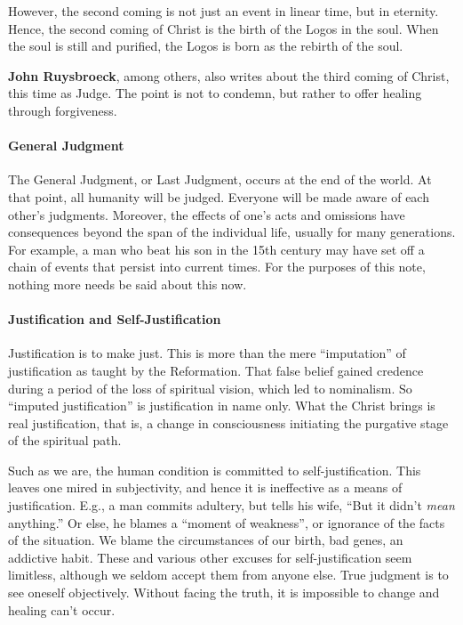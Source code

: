 However, the second coming is not just an event in linear time, but in eternity. Hence, the second coming of Christ is
the birth of the Logos in the soul. When the soul is still and purified, the Logos is born as the rebirth of the soul.

\textbf{John Ruysbroeck}, among others, also writes about the third coming of Christ, this time as Judge. The point is
not to condemn, but rather to offer healing through forgiveness.

\paragraph{General Judgment}
The General Judgment, or Last Judgment, occurs at the end of the world. At that point, all humanity will be judged.
Everyone will be made aware of each other's judgments. Moreover, the effects of one's acts and
omissions have consequences beyond the span of the individual life, usually for many generations. For example, a man
who beat his son in the 15th century may have set off a chain of events that persist into current times. For the
purposes of this note, nothing more needs be said about this now.

\paragraph{Justification and Self-Justification}
Justification is to make just. This is more than the mere “imputation” of justification as taught by the Reformation.
That false belief gained credence during a period of the loss of spiritual vision, which led to nominalism. So “imputed
justification” is justification in name only. What the Christ brings is real justification, that is, a change in
consciousness initiating the purgative stage of the spiritual path.

Such as we are, the human condition is committed to self-justification. This leaves one mired in subjectivity, and hence
it is ineffective as a means of justification. E.g., a man commits adultery, but tells his wife, “But it
didn't \emph{mean} anything.” Or else, he blames a “moment of weakness”, or ignorance of the facts of the
situation. We blame the circumstances of our birth, bad genes, an addictive habit. These and various other excuses for
self-justification seem limitless, although we seldom accept them from anyone else. True judgment is to see oneself
objectively. Without facing the truth, it is impossible to change and healing can't occur.

